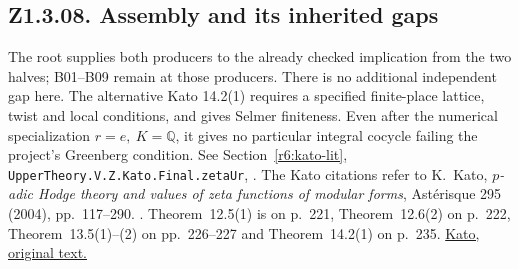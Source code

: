 \subsection{Z1.3.08. Assembly and its inherited gaps}\label{r7:Z1.3.08}
The root supplies both producers to the already checked implication
from the two halves; B01--B09 remain at those producers. There is no
additional independent gap here. The alternative Kato 14.2(1) requires
a specified finite-place lattice, twist and local conditions, and gives
Selmer finiteness. Even after the numerical specialization \(r=e,\ K=\mathbb Q\),
it gives no particular integral cocycle failing the project's Greenberg
condition. See Section~\ref{r6:kato-lit},
\nolinkurl{UpperTheory.V.Z.Kato.Final.zetaUr}, .
The Kato citations refer to K.~Kato, \emph{\(p\)-adic Hodge theory and
values of zeta functions of modular forms}, Astérisque 295 (2004), pp.~117--290.
\cite{S-Kato}. Theorem~12.5(1) is on p.~221, Theorem~12.6(2) on p.~222, Theorem~13.5(1)--(2) on pp.~226--227 and Theorem~14.2(1) on p.~235. \href{https://www.numdam.org/article/AST_2004__295__117_0.pdf}{Kato, original text.}

